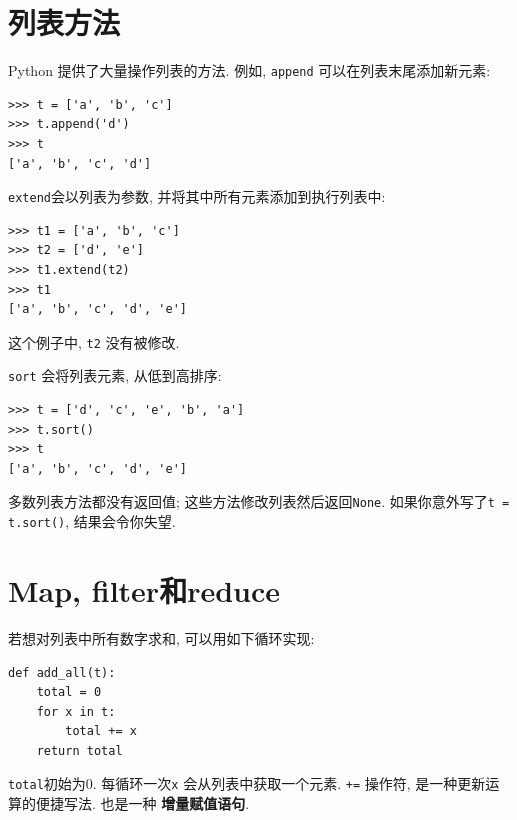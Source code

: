 \documentclass[10pt]{book}
\begin{document}
%


\section{列表方法}

Python 提供了大量操作列表的方法. 例如, 
{\tt append} 可以在列表末尾添加新元素:

\begin{verbatim}
>>> t = ['a', 'b', 'c']
>>> t.append('d')
>>> t
['a', 'b', 'c', 'd']
\end{verbatim}
%
{\tt extend}会以列表为参数, 并将其中所有元素添加到执行列表中:

\begin{verbatim}
>>> t1 = ['a', 'b', 'c']
>>> t2 = ['d', 'e']
>>> t1.extend(t2)
>>> t1
['a', 'b', 'c', 'd', 'e']
\end{verbatim}
%
这个例子中, {\tt t2} 没有被修改. 

{\tt sort} 会将列表元素, 从低到高排序:

\begin{verbatim}
>>> t = ['d', 'c', 'e', 'b', 'a']
>>> t.sort()
>>> t
['a', 'b', 'c', 'd', 'e']
\end{verbatim}
%
多数列表方法都没有返回值; 这些方法修改列表然后返回{\tt None}. 
如果你意外写了{\tt t = t.sort()}, 结果会令你失望. 


\section{Map, filter和reduce}
\label{filter}

若想对列表中所有数字求和, 可以用如下循环实现:


\begin{verbatim}
def add_all(t):
    total = 0
    for x in t:
        total += x
    return total
\end{verbatim}
%
{\tt total}初始为0.
每循环一次{\tt x} 会从列表中获取一个元素. {\tt +=} 操作符, 是一种更新运算的便捷写法. 
也是一种 {\bf 增量赋值语句}. 
\end{document}
